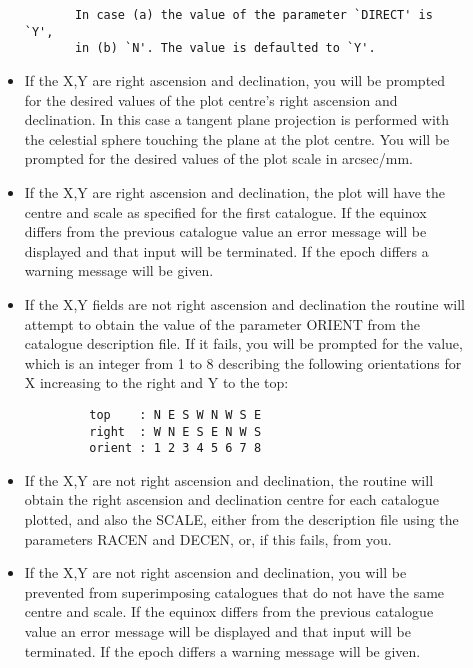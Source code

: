 \begin{description}
\begin{itemize}
\begin{verbatim}
       In case (a) the value of the parameter `DIRECT' is `Y',
       in (b) `N'. The value is defaulted to `Y'.
\end{verbatim}
\item If the X,Y are right ascension and declination, you will be
prompted for the desired values of the plot centre's right ascension
and declination.  
In this case a tangent plane projection is performed with the celestial 
sphere touching the plane at the plot centre.
You will be prompted for the desired values of the plot scale in 
arcsec/mm.
\item If the X,Y are right ascension and declination, the plot will have
the centre and scale as specified for the first catalogue. 
If the equinox differs from the previous catalogue value an error message
will be displayed and that input will be terminated. 
If the epoch differs a warning message will be given.
\item If the X,Y fields are not right ascension and declination the routine
will attempt to obtain the value of the parameter ORIENT from the
catalogue description file.  
If it fails, you will be prompted for the value, which is an integer 
from 1 to 8 describing the following orientations for X increasing to the 
right and Y to the top:
\begin{verbatim}
         top    : N E S W N W S E
         right  : W N E S E N W S
         orient : 1 2 3 4 5 6 7 8
\end{verbatim}
\item If the X,Y are not right ascension and declination, the routine
will obtain the right ascension and declination centre for each
catalogue plotted, and also the SCALE, either from the description file 
using the parameters RACEN and DECEN, or, if this fails, from you.
\item If the X,Y are not right ascension and declination, you will
be prevented from superimposing catalogues that do not have the same
centre and scale.  
If the equinox differs from the previous catalogue value an error message 
will be displayed and that input will be terminated. 
If the epoch differs a warning message will be given.
\end{itemize}
\end{description}
